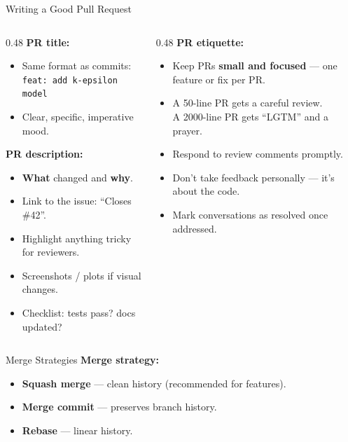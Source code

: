 \documentclass[aspectratio=169, 11pt]{beamer}
\begin{document}
\begin{frame}{Writing a Good Pull Request}
  \begin{columns}[T]
    \begin{column}{0.48\textwidth}
      \textbf{PR title:}
      \begin{itemize}
        \item Same format as commits: \\ \texttt{feat: add k-epsilon model}
        \item Clear, specific, imperative mood.
      \end{itemize}

      \vspace{0.5em}
      \textbf{PR description:}
      \begin{itemize}
        \item \textbf{What} changed and \textbf{why}.
        \item Link to the issue: ``Closes \#42''.
        \item Highlight anything tricky for reviewers.
        \item Screenshots / plots if visual changes.
        \item Checklist: tests pass? docs updated?
      \end{itemize}
    \end{column}
    \begin{column}{0.48\textwidth}
      \textbf{PR etiquette:}
      \begin{itemize}
        \item Keep PRs \textbf{small and focused} --- one feature or fix per PR.
        \item A 50-line PR gets a careful review. \\ A 2000-line PR gets ``LGTM'' and a prayer.
        \item Respond to review comments promptly.
        \item Don't take feedback personally --- it's about the code.
        \item Mark conversations as resolved once addressed.
      \end{itemize}
\end{column}
  \end{columns}
\end{frame}

\begin{frame}{Merge Strategies}
      \vspace{0.5em}
      \textbf{Merge strategy:}
      \begin{itemize}
        \item \textbf{Squash merge} --- clean history (recommended for features).
        \item \textbf{Merge commit} --- preserves branch history.
        \item \textbf{Rebase} --- linear history.
      \end{itemize}
\end{frame}
\end{document}
